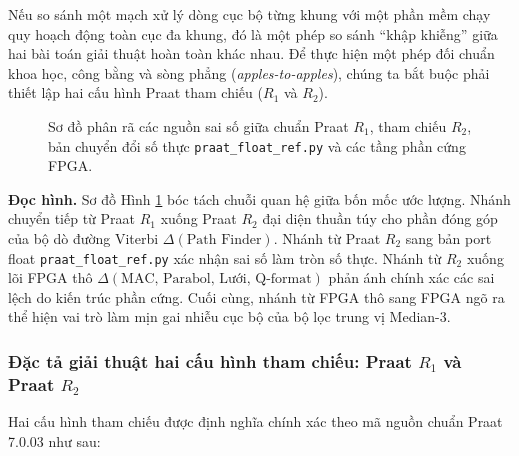 Nếu so sánh một mạch xử lý dòng cục bộ từng khung với một phần mềm chạy quy hoạch động toàn cục đa khung, đó là một phép so sánh ``khập khiễng'' giữa hai bài toán giải thuật hoàn toàn khác nhau. Để thực hiện một phép đối chuẩn khoa học, công bằng và sòng phẳng (\emph{apples-to-apples}), chúng ta bắt buộc phải thiết lập hai cấu hình Praat tham chiếu ($R_1$ và $R_2$).

\begin{figure}[htbp]
\centering

\caption{Sơ đồ phân rã các nguồn sai số giữa chuẩn Praat $R_1$, tham chiếu $R_2$, bản chuyển đổi số thực \texttt{praat\_float\_ref.py} và các tầng phần cứng FPGA.}
\label{fig:ch13_error_decomp}
\end{figure}

\textbf{Đọc hình.} Sơ đồ Hình \ref{fig:ch13_error_decomp} bóc tách chuỗi quan hệ giữa bốn mốc ước lượng. Nhánh chuyển tiếp từ Praat $R_1$ xuống Praat $R_2$ đại diện thuần túy cho phần đóng góp của bộ dò đường Viterbi $\Delta(\text{Path Finder})$. Nhánh từ Praat $R_2$ sang bản port float \texttt{praat\_float\_ref.py} xác nhận sai số làm tròn số thực. Nhánh từ $R_2$ xuống lõi FPGA thô $\Delta(\text{MAC, Parabol, Lưới, Q-format})$ phản ánh chính xác các sai lệch do kiến trúc phần cứng. Cuối cùng, nhánh từ FPGA thô sang FPGA ngõ ra thể hiện vai trò làm mịn gai nhiễu cục bộ của bộ lọc trung vị Median-3.

\subsubsection*{Đặc tả giải thuật hai cấu hình tham chiếu: Praat $R_1$ và Praat $R_2$}
Hai cấu hình tham chiếu được định nghĩa chính xác theo mã nguồn chuẩn Praat 7.0.03 như sau:

